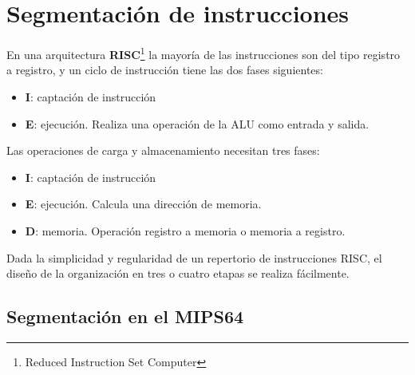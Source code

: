 \section{Segmentación de instrucciones}\label{sec:segmetation}

En una arquitectura \textbf{RISC}\footnote{Reduced Instruction Set Computer} la mayoría de las instrucciones son del tipo registro a registro, y un ciclo de instrucción tiene las dos fases siguientes:

\begin{itemize}
  \item \textbf{I}: captación de instrucción
  \item \textbf{E}: ejecución. Realiza una operación de la ALU como entrada y salida.
\end{itemize}

Las operaciones de carga y almacenamiento necesitan tres fases:

\begin{itemize}
  \item \textbf{I}: captación de instrucción
  \item \textbf{E}: ejecución. Calcula una dirección de memoria.
  \item \textbf{D}: memoria. Operación registro a memoria o memoria a registro.
\end{itemize}

Dada la simplicidad y regularidad de un repertorio de instrucciones RISC, el diseño de la organización en tres o cuatro etapas se realiza fácilmente. 

\subsection{Segmentación en el MIPS64}

